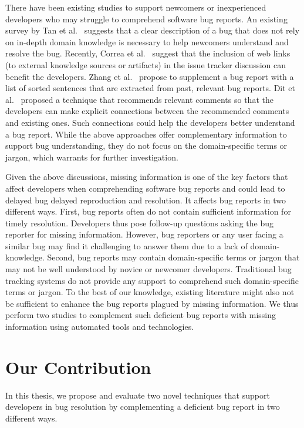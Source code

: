 There have been existing studies to support newcomers or inexperienced developers who may struggle to comprehend software bug reports. An existing survey by Tan et al.~\cite{tan2020first} suggests that a clear description of a bug that does not rely on in-depth domain knowledge is necessary to help newcomers understand and resolve the bug. Recently, Correa et al.~\cite{correa2013samekana} suggest that the inclusion of web links (to external knowledge sources or artifacts) in the issue tracker discussion can benefit the developers. Zhang et al.~\cite{zhang2017bug} propose to supplement a bug report with a list of sorted sentences that are extracted from past, relevant bug reports. Dit et al.~\cite{dit2008improving} proposed a technique that recommends relevant comments so that the developers can make explicit connections between the recommended comments and existing ones. Such connections could help the developers better understand a bug report. While the above approaches offer complementary information to support bug understanding, they do not focus on the domain-specific terms or jargon, which warrants for further investigation.\par

Given the above discussions, missing information is one of the key factors that affect developers when comprehending software bug reports and could lead to delayed bug delayed reproduction and resolution. It affects bug reports in two different ways. First, bug reports often do not contain sufficient information for timely resolution. Developers thus pose follow-up questions asking the bug reporter for missing information. However, bug reporters or any user facing a similar bug may find it challenging to answer them due to a lack of domain-knowledge. Second, bug reports may contain domain-specific terms or jargon that may not be well understood by novice or newcomer developers. Traditional bug tracking systems do not provide any support to comprehend such domain-specific terms or jargon. To the best of our knowledge, existing literature might also not be sufficient to enhance the bug reports plagued by missing information. We thus perform two studies to complement such deficient bug reports with missing information using automated tools and technologies. \par

 
\section{Our Contribution}
In this thesis, we propose and evaluate two novel techniques that support developers in bug resolution by complementing a deficient bug report in two different ways.

